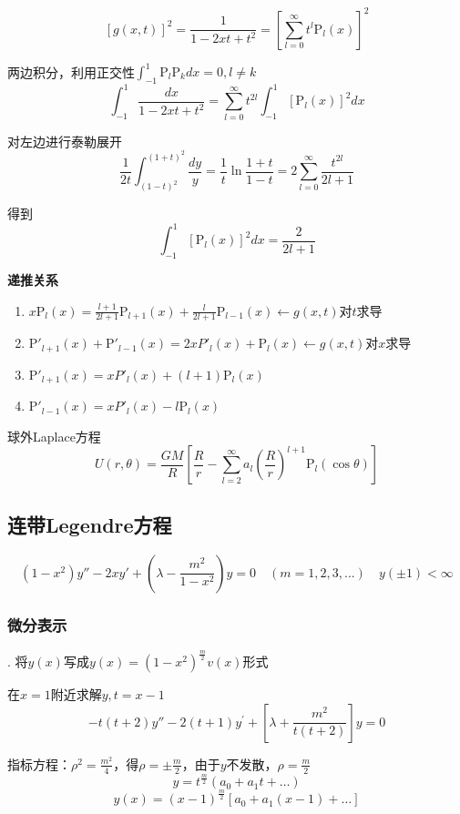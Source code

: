 \begin{app}[计算$||\mathrm{P}_l||^2$]
$$[g(x,t)]^2=\frac{1}{1-2xt+t^2}=\left[\sum_{l=0}^\infty t^l\mathrm{P}_l(x)\right]^2$$

两边积分，利用正交性$\int_{-1}^1\mathrm{P}_l\mathrm{P}_kdx=0,l\ne k$
$$\int_{-1}^1\frac{dx}{1-2xt+t^2}=\sum_{l=0}^\infty t^{2l}\int_{-1}^1[\mathrm{P}_l(x)]^2dx$$

对左边进行泰勒展开
$$\frac{1}{2t}\int_{(1-t)^2}^{(1+t)^2}\frac{dy}{y}=\frac{1}{t}\ln\frac{1+t}{1-t}=2\sum_{l=0}^\infty\frac{t^{2l}}{2l+1}$$

得到
$$\int_{-1}^1[\mathrm{P}_l(x)]^2dx=\frac{2}{2l+1}$$

\end{app}

\begin{app}\textbf{递推关系}
\begin{enumerate}
    \item $x\mathrm{P}_l(x)=\frac{l+1}{2l+1}\mathrm{P}_{l+1}(x)+\frac{l}{2l+1}\mathrm{P}_{l-1}(x)\leftarrow g(x,t)$对$t$求导
    \item $\mathrm{P}'_{l+1}(x)+\mathrm{P}'_{l-1}(x)=2xP'_l(x)+\mathrm{P}_l(x)\leftarrow g(x,t)$对$x$求导
    \item $\mathrm{P}'_{l+1}(x)=xP'_l(x)+(l+1)\mathrm{P}_l(x)$
    \item $\mathrm{P}'_{l-1}(x)=xP'_l(x)-l\mathrm{P}_l(x)$
\end{enumerate}
\end{app}

\begin{ex}[地球外部引力场]球外Laplace方程
$$U(r,\theta)=\frac{GM}{R}\left[\frac{R}{r}-\sum_{l=2}^\infty a_l\left(\frac{R}{r}\right)^{l+1}\mathrm{P}_l(\cos\theta)\right]$$
\end{ex}

\subsection{连带Legendre方程}
$$(1-x^2)y''-2xy'+\left(\lambda-\frac{m^2}{1-x^2}\right)y=0\quad(m=1,2,3,...)\quad y(\pm1)<\infty$$
\subsubsection{微分表示}
. 将$y(x)$写成$y(x)=(1-x^{2})^{\frac{m}{2}}v(x)$形式

在$x=1$附近求解$y,t=x-1$
$$-t(t+2)y''-2(t+1)y^{\prime}+\left[\lambda+\frac{m^{2}}{t(t+2)}\right]y=0$$

指标方程：$\rho^2=\frac{m^2}{4}$，得$\rho=\pm\frac{m}{2}$，由于$y$不发散，$\rho=\frac{m}{2}$
$$y=t^{\frac{m}{2}}(a_{0}+a_{1}t+\dots)$$
$$y(x)=(x-1)^{\frac m2}[a_0+a_1(x-1)+\dots]$$

